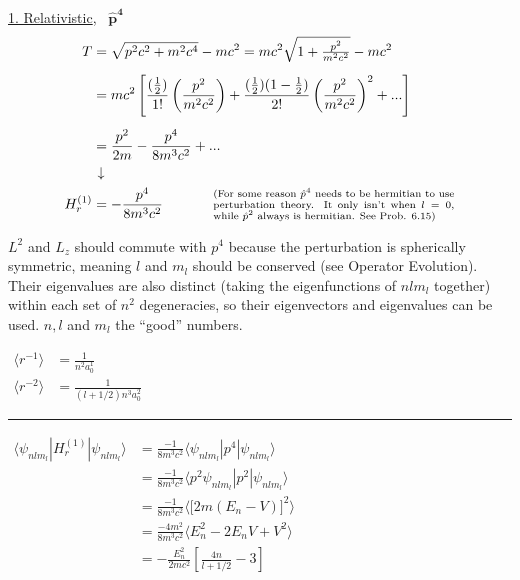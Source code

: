\documentclass[12pt]{article}
\newcommand{\hs}{\hspace{1pt}} %
\begin{document}
\vspace{15pt}\noindent
\underline{1. Relativistic}, \ \(\boldsymbol{\hat{p}^4}\)
\begin{align*}
    T & = \sqrt{p^2c^2 + m^2c^4} - mc^2 
        = mc^2 \sqrt{1 + \tfrac{p^2}{m^2c^2}} - mc^2
        \\[5pt]
    & = mc^2 \left[
            \frac{ (\tfrac{1}{2}) }{1!} \left( \frac{p^2}{m^2c^2} \right) 
            + \frac{ (\tfrac{1}{2}) (1 - \tfrac{1}{2}) }{2!} \left( \frac{p^2}{m^2c^2} \right)^2  + ...
        \right]
        \\[5pt]
    & = \frac{p^2}{2m} - \frac{p^4}{8 m^3 c^2} + ...\\
    & \hs \downarrow\\
    H^{(1)}_r & = - \frac{p^4}{8 m^3 c^2} 
        \hspace{18pt} \hspace{18pt}
        \parbox{.5\textwidth}{
            \scriptsize(For some reason \(\hat{p}^4\) needs to be hermitian to use perturbation theory. 
            It only isn't when \(l=0\), while \(\hat{p}^2\) always is hermitian. See Prob. 6.15)    
        }
\end{align*}

\vspace{5pt} \noindent
\(L^2\) and \(L_z\) should commute with \(p^4\) because the perturbation is spherically symmetric, meaning 
\(l\) and \(m_l\) should be conserved (see Operator Evolution). Their eigenvalues are also distinct 
(taking the eigenfunctions of \(nlm_l\) together) within each set of \(n^2\) degeneracies, so their eigenvectors and 
eigenvalues can be used. \(n, l\) and \(m_l\) the ``good'' numbers.

\vspace{10pt}
\(\begin{aligned}
    \langle r^{-1} \rangle &= \tfrac{1}{n^2 a_0^1 }\\[5pt]
    \langle r^{-2} \rangle &= \tfrac{1}{ (l + 1/2) n^3 a_0^2 }
\end{aligned}\)
\hspace{10pt}
\rule[-85pt]{.5pt}{170pt}
\hspace{10pt}
\(\begin{aligned}
    \langle \psi_{nlm_l} | H^{(1)}_r | \psi_{nlm_l} \Big\rangle 
        &= \frac{- 1}{8 m^3 c^2} \langle \psi_{nlm_l} | p^4 | \psi_{nlm_l} \rangle\\[5pt]
    &= \frac{- 1}{8 m^3 c^2} \langle p^2 \psi_{nlm_l} | p^2 | \psi_{nlm_l} \rangle\\[5pt]
    &= \frac{- 1}{8 m^3 c^2} \Big\langle \big[ 2m(E_n-V) \big]^2 \Big\rangle\\[5pt]
    &= \frac{- 4m^2}{8 m^3 c^2} \langle E_n^2 -2E_nV + V^2 \rangle\\[5pt]
    &= - \frac{E_n^2}{2mc^2} \left[ \frac{4n}{l + 1/2} - 3\right]
\end{aligned}\)
\end{document}
